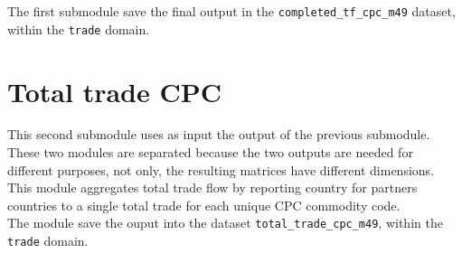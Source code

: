 \documentclass[nojss]{jss}\usepackage[]{graphicx}\usepackage[]{color}
\begin{document}
The first submodule save the final output in the {\tt completed\_tf\_cpc\_m49} dataset, within the {\tt trade} domain.

\section{Total trade CPC}
This second submodule uses as input the output of the previous submodule. These two modules are separated because the two outputs are needed for different purposes, not only, the resulting matrices have different dimensions.\\
This module aggregates total trade flow by reporting country for partners countries to a single total trade for each unique CPC commodity code.\\
The module save the ouput into the dataset {\tt total\_trade\_cpc\_m49}, within the {\tt trade} domain.

\newpage
\end{document}
